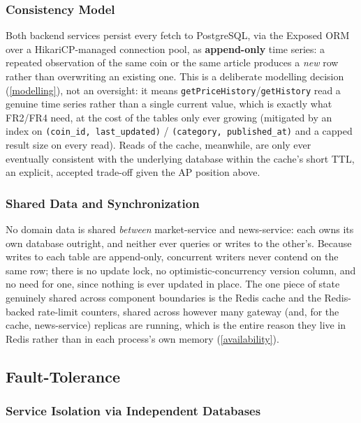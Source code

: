 \documentclass{scrartcl}
\begin{document}
\subsubsection{Consistency Model}\label{consistency-model}

Both backend services persist every fetch to PostgreSQL, via the Exposed ORM over a
HikariCP-managed connection pool, as \textbf{append-only} time series: a repeated observation of
the same coin or the same article produces a \emph{new} row rather than overwriting an existing
one. This is a deliberate modelling decision (\cref{modelling}), not an oversight: it means
\texttt{getPriceHistory}/\texttt{getHistory} read a genuine time series rather than a single
current value, which is exactly what FR2/FR4 need, at the cost of the tables only ever growing
(mitigated by an index on \texttt{(coin\_id, last\_updated)} / \texttt{(category,
published\_at)} and a capped result size on every read). Reads of the cache, meanwhile, are only
ever eventually consistent with the underlying database within the cache's short TTL, an
explicit, accepted trade-off given the AP position above.

\subsubsection{Shared Data and Synchronization}\label{shared-data-sync}

No domain data is shared \emph{between} market-service and news-service: each owns its own
database outright, and neither ever queries or writes to the other's. Because writes to each
table are append-only, concurrent writers never contend on the same row; there is no update lock,
no optimistic-concurrency version column, and no need for one, since nothing is ever updated in
place. The one piece of state genuinely shared across component boundaries is the Redis cache and
the Redis-backed rate-limit counters, shared across however many gateway (and, for the cache,
news-service) replicas are running, which is the entire reason they live in Redis rather than in
each process's own memory (\cref{availability}).

\subsection{Fault-Tolerance}\label{fault-tolerance}

\subsubsection{Service Isolation via Independent Databases}\label{fault-tolerance-isolation}
\end{document}
